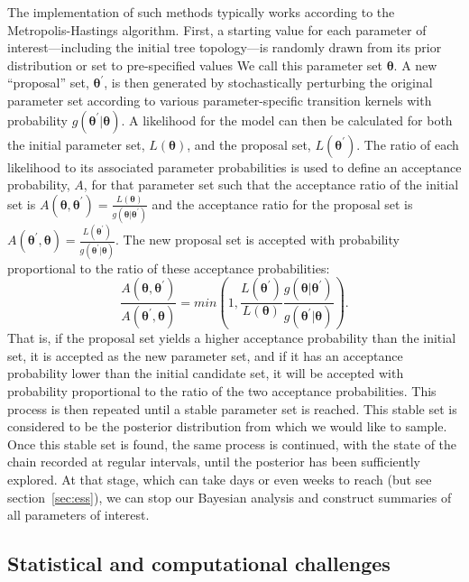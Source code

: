 The implementation of such methods typically works according to the Metropolis-Hastings algorithm\cite{metropolis1953equation, hastings1970monte}.
First, a starting value for each parameter of interest---including the initial tree topology---is randomly drawn from its prior distribution or set to pre-specified values
We call this parameter set $\mathbf{\theta}$.
A new ``proposal'' set, $\mathbf{\theta^\prime}$, is then generated by stochastically perturbing the original parameter set according to various parameter-specific transition kernels with probability $g(\mathbf{\theta^\prime}\vert\mathbf{\theta})$.
A likelihood for the model can then be calculated for both the initial parameter set, $L(\mathbf{\theta})$, and the proposal set, $L(\mathbf{\theta^{\prime}})$.
The ratio of each likelihood to its associated parameter probabilities is used to define an acceptance probability, $A$, for that parameter set such that the acceptance ratio of the initial set is $A(\mathbf{\theta}, \mathbf{\theta^{\prime}})=\frac{L(\mathbf{\theta})}{g(\mathbf{\theta}\vert\mathbf{\theta^\prime})}$ and the acceptance ratio for the proposal set is $A(\mathbf{\theta^\prime}, \mathbf{\theta})=\frac{L(\mathbf{\theta^\prime})}{g(\mathbf{\theta^\prime}\vert\mathbf{\theta})}$.
The new proposal set is accepted with probability proportional to the ratio of these acceptance probabilities:
$$
\frac{A(\mathbf{\theta}, \mathbf{\theta^{\prime}})}{A(\mathbf{\theta^\prime}, \mathbf{\theta})} = min(1,\frac{L(\mathbf{\theta^\prime})}{L(\mathbf{\theta})}\frac{g(\mathbf{\theta}\vert\mathbf{\theta^\prime})}{g(\mathbf{\theta^\prime}\vert\mathbf{\theta})}).
$$
That is, if the proposal set yields a higher acceptance probability than the initial set, it is accepted as the new parameter set, and if it has an acceptance probability lower than the initial candidate set, it will be accepted with probability proportional to the ratio of the two acceptance probabilities.
This process is then repeated until a stable parameter set is reached.
This stable set is considered to be the posterior distribution from which we would like to sample.
Once this stable set is found, the same process is continued, with the state of the chain recorded at regular intervals, until the posterior has been sufficiently explored.
At that stage, which can take days or even weeks to reach (but see section~\ref{sec:ess}), we can stop our Bayesian analysis and construct summaries of all parameters of interest.

\subsection{Statistical and computational challenges}

